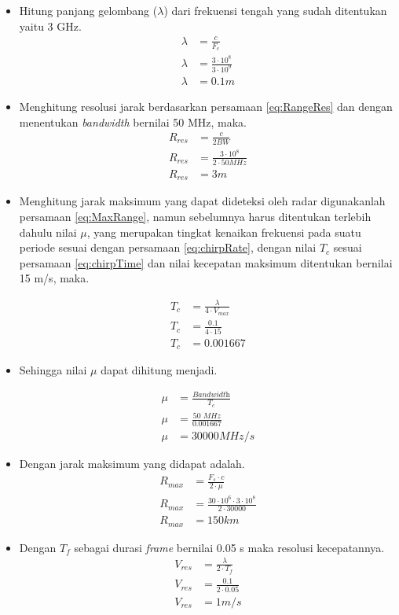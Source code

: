 \begin{itemize}
	\item Hitung panjang gelombang ($\lambda$) dari frekuensi tengah yang sudah ditentukan yaitu 3 GHz.
	\begin{align*}
		\lambda &= \frac{c}{F_{c}}\\
		\lambda &= \frac{3 \cdot 10^{8}}{3 \cdot 10^{9}}\\
		\lambda &= 0.1 m
	\end{align*}

	\item Menghitung resolusi jarak berdasarkan persamaan \ref{eq:RangeRes} dan dengan menentukan \textit{bandwidth} bernilai 50 MHz, maka.
		\begin{align*}
			R_{res} &= \frac{c}{2 BW} \\
			R_{res} &= \frac{3 \cdot 10^{8}}{2 \cdot 50 MHz}\\
			R_{res} &= 3 m
		\end{align*}
	\item Menghitung jarak maksimum yang dapat dideteksi oleh radar digunakanlah persamaan \ref{eq:MaxRange}, namun sebelumnya harus ditentukan terlebih dahulu nilai $\mu$, yang merupakan tingkat kenaikan frekuensi pada suatu periode sesuai dengan persamaan \ref{eq:chirpRate}, dengan nilai $T_{c}$ sesuai persamaan \ref{eq:chirpTime} dan nilai kecepatan maksimum ditentukan bernilai 15 m/s, maka.
	
	\begin{align*}
		T_{c} &= \frac{\lambda}{4 \cdot V_{max}}\\
		T_{c} &= \frac{0.1}{4 \cdot 15}\\
		T_{c} &= 0.001667
	\end{align*}

	\item 
	Sehingga nilai $\mu$ dapat dihitung menjadi.

		\begin{align*}
		\mu &= \frac{\textit{Bandwidth}}{T_{c}}\\
		\mu &= \frac{\textit{50 MHz}}{0.001667}\\
		\mu &= 30000 MHz/s
		\end{align*}

	\item 	
	Dengan jarak maksimum yang didapat adalah.
		\begin{align*}
		R_{max} &= \frac{F_{s} \cdot c}{2 \cdot \mu}\\
		R_{max} &= \frac{30 \cdot 10^{6} \cdot 3 \cdot 10^{8}}{2 \cdot 30000}\\
		R_{max} &= 150 km
		\end{align*}

	\item 
	Dengan $T_{f}$ sebagai durasi \textit{frame} bernilai 0.05 s maka resolusi kecepatannya.
		\begin{align*}
			V_{res} &= \frac{\lambda}{2 \cdot T_{f}}\\
			V_{res} &= \frac{0.1}{2 \cdot 0.05}\\
			V_{res} &= 1 m/s
		\end{align*}

\end{itemize}

